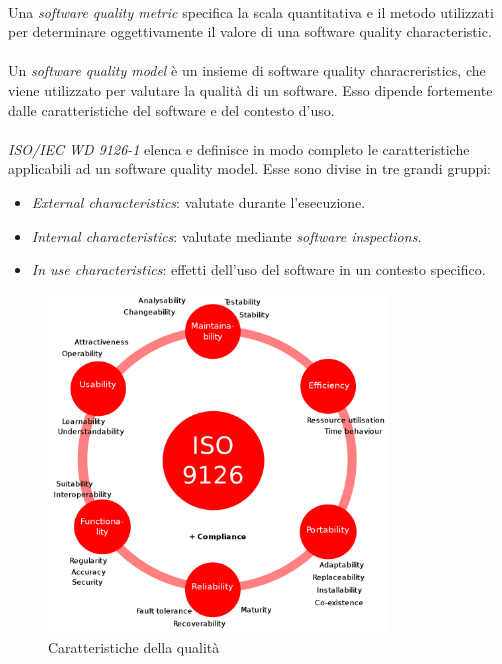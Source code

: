\documentclass[12pt,a4paper,twoside,english,italian]{book}
\begin{document}
\paragraph{} Una \emph{software quality metric} specifica la scala quantitativa e il metodo utilizzati per determinare oggettivamente il valore di una software quality characteristic. 

\paragraph{} Un \emph{software quality model} è un insieme di software quality characreristics, che viene utilizzato per valutare la qualità di un software. Esso dipende fortemente dalle caratteristiche del software e del contesto d'uso. 

\paragraph{} \emph{ISO/IEC WD 9126-1} elenca e definisce in modo completo le caratteristiche applicabili ad un software quality model. Esse sono divise in tre grandi gruppi: \begin{itemize}
    \item \emph{External characteristics}: valutate durante l'esecuzione.
    \item \emph{Internal characteristics}: valutate mediante \emph{software inspections}.
    \item \emph{In use characteristics}: effetti dell'uso del software in un contesto specifico.
\end{itemize}

\begin{figure}[H]
    \centering
    \includegraphics[width=0.8\textwidth]{img/iso_9126.png}
    \caption{Caratteristiche della qualità}
\end{figure}
\end{document}
